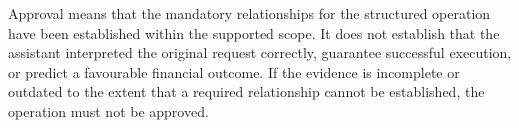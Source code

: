 Approval means that the mandatory relationships for the structured
operation have been established within the supported scope. It does
not establish that the assistant interpreted the original request
correctly, guarantee successful execution, or predict a favourable
financial outcome. If the evidence is incomplete or outdated to the
extent that a required relationship cannot be established, the
operation must not be approved.















